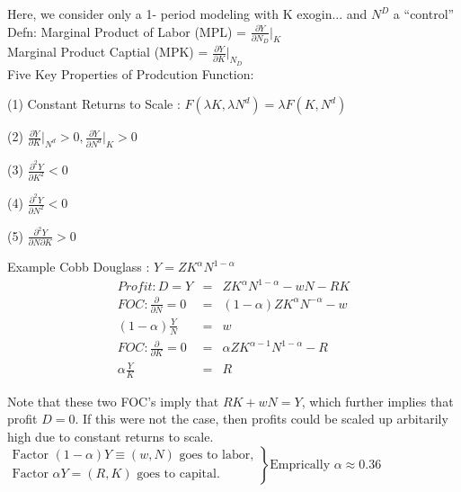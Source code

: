 Here, we consider only a 1- period modeling with K exogin... and $N^D$ a ``control''\\

Defn: Marginal Product of Labor (MPL) = $ \frac{\partial Y}{\partial N_D} \vert_K$ \\
Marginal Product Captial (MPK) = $ \frac{\partial Y}{\partial K} \vert_{N_D}$ \\

Five Key Properties of Prodcution Function:\\
\begin{list}{ }{}
\item (1) Constant Returns to Scale : $F(\lambda K, \lambda N^d) = \lambda F(K, N^d)$
\item (2) $ \frac{\partial Y}{\partial K} \vert_{N^d} > 0, \frac{\partial Y}{\partial N^d} \vert_{K} > 0 $
\item (3) $ \frac{\partial^2 Y}{\partial K^2} < 0 $
\item (4) $ \frac{\partial^2 Y}{\partial N^2} < 0 $
\item (5) $ \frac{\partial^2 Y}{\partial N \partial K} > 0 $
\end{list}

Example Cobb Douglass : $Y = Z K^{\alpha} N^{1-\alpha}$\\
\begin{eqnarray*}
Profit : D = Y &=& Z K^{\alpha} N^{1-\alpha} - wN - RK\\
FOC : \frac{\partial}{\partial N} = 0 &=& (1- \alpha) Z K^\alpha N^{-\alpha} - w\\
(1-\alpha) \frac{Y}{N} &=& w\\
FOC : \frac{\partial}{\partial K} = 0 &=& \alpha Z K^{\alpha -1} N^{1-\alpha} - R\\
\alpha \frac{Y}{K} &=& R
\end{eqnarray*}

Note that these two FOC's imply that $RK + wN = Y$, which further implies that profit $D = 0$. If this were not the case, then profits could be scaled up arbitarily high due to constant returns to scale.\\

$\left. 
\begin{array}{ll}
\mbox{Factor $(1-\alpha) Y \equiv (w, N)$ goes to labor,}\\
\mbox{Factor $\alpha Y = (R,K)$ goes to capital.}
\end{array} 
\right\}\mbox{Emprically $\alpha \approx 0.36$} $ \\

